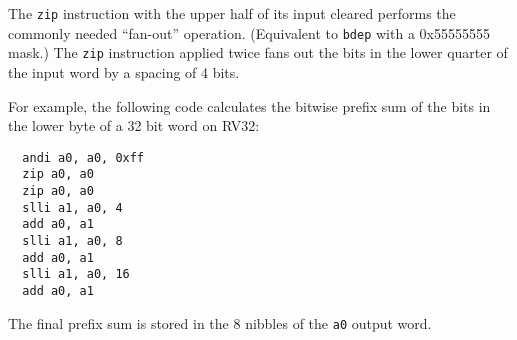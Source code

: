 The \texttt{zip} instruction with the upper half of its input cleared performs
the commonly needed ``fan-out'' operation. (Equivalent to {\tt bdep} with a
0x55555555 mask.) The \texttt{zip} instruction applied twice fans out the bits
in the lower quarter of the input word by a spacing of 4 bits.

For example, the following code calculates the bitwise prefix sum of the bits
in the lower byte of a 32 bit word on RV32:

\begin{verbatim}
  andi a0, a0, 0xff
  zip a0, a0
  zip a0, a0
  slli a1, a0, 4
  add a0, a1
  slli a1, a0, 8
  add a0, a1
  slli a1, a0, 16
  add a0, a1
\end{verbatim}

The final prefix sum is stored in the 8 nibbles of the {\tt a0} output word.
